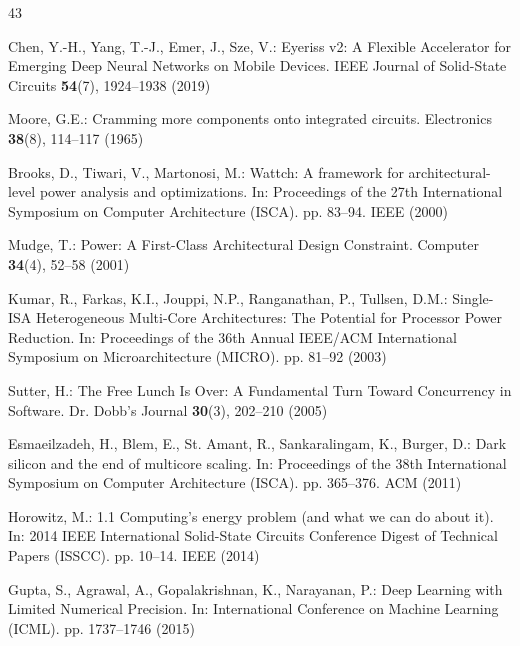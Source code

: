 \documentclass[conference]{IEEEtran}
\begin{document}
\begin{thebibliography}{43}

Chen, Y.-H., Yang, T.-J., Emer, J., Sze, V.: Eyeriss v2: A Flexible Accelerator for Emerging Deep Neural Networks on Mobile Devices. IEEE Journal of Solid-State Circuits \textbf{54}(7), 1924--1938 (2019)


Moore, G.E.: Cramming more components onto integrated circuits. Electronics \textbf{38}(8), 114--117 (1965)


Brooks, D., Tiwari, V., Martonosi, M.: Wattch: A framework for architectural-level power analysis and optimizations. In: Proceedings of the 27th International Symposium on Computer Architecture (ISCA). pp. 83--94. IEEE (2000)


Mudge, T.: Power: A First-Class Architectural Design Constraint. Computer \textbf{34}(4), 52--58 (2001)


Kumar, R., Farkas, K.I., Jouppi, N.P., Ranganathan, P., Tullsen, D.M.: Single-ISA Heterogeneous Multi-Core Architectures: The Potential for Processor Power Reduction. In: Proceedings of the 36th Annual IEEE/ACM International Symposium on Microarchitecture (MICRO). pp. 81--92 (2003)


Sutter, H.: The Free Lunch Is Over: A Fundamental Turn Toward Concurrency in Software. Dr. Dobb's Journal \textbf{30}(3), 202--210 (2005)


Esmaeilzadeh, H., Blem, E., St. Amant, R., Sankaralingam, K., Burger, D.: Dark silicon and the end of multicore scaling. In: Proceedings of the 38th International Symposium on Computer Architecture (ISCA). pp. 365--376. ACM (2011)


Horowitz, M.: 1.1 Computing's energy problem (and what we can do about it). In: 2014 IEEE International Solid-State Circuits Conference Digest of Technical Papers (ISSCC). pp. 10--14. IEEE (2014)


Gupta, S., Agrawal, A., Gopalakrishnan, K., Narayanan, P.: Deep Learning with Limited Numerical Precision. In: International Conference on Machine Learning (ICML). pp. 1737--1746 (2015)


\end{thebibliography}
\end{document}
